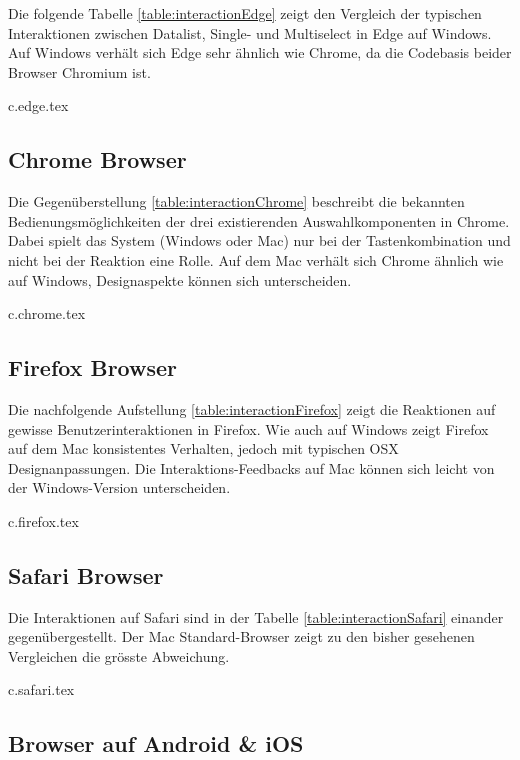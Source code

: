 Die folgende Tabelle \ref{table:interactionEdge} zeigt den Vergleich der typischen Interaktionen zwischen Datalist, Single- und Multiselect in Edge auf Windows. 
Auf Windows verhält sich Edge sehr ähnlich wie Chrome, da die Codebasis beider Browser Chromium ist. 

{c.edge.tex}


\clearpage
\subsection{Chrome Browser}
\label{sec:chromeBrowser}

Die Gegenüberstellung \ref{table:interactionChrome} beschreibt die bekannten Bedienungsmöglichkeiten der drei existierenden Auswahlkomponenten in Chrome. 
Dabei spielt das System (Windows oder Mac) nur bei der Tastenkombination und nicht bei der Reaktion eine Rolle. 
Auf dem Mac verhält sich Chrome ähnlich wie auf Windows, Designaspekte können sich unterscheiden. 

{c.chrome.tex}


\clearpage
\subsection{Firefox Browser}
\label{sec:firefoxBrowser}

Die nachfolgende Aufstellung \ref{table:interactionFirefox} zeigt die Reaktionen auf gewisse Benutzerinteraktionen in Firefox. 
Wie auch auf Windows zeigt Firefox auf dem Mac konsistentes Verhalten, jedoch mit typischen OSX Designanpassungen. 
Die Interaktions-Feedbacks auf Mac können sich leicht von der Windows-Version unterscheiden. 

{c.firefox.tex}


\clearpage
\subsection{Safari Browser}
\label{sec:safariBrowser}

Die Interaktionen auf Safari sind in der Tabelle \ref{table:interactionSafari} einander gegenübergestellt. 
Der Mac Standard-Browser zeigt zu den bisher gesehenen Vergleichen die grösste Abweichung. 

{c.safari.tex}


\clearpage
\subsection{Browser auf Android \& iOS}
\label{sec:mobileBrowser}

